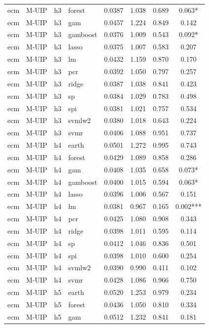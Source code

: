 \begin{ThreePartTable}
\begin{longtable}[t]{llclcccc}
ecm & M-UIP & h3 & forest & 0.0387 & 1.038 & 0.689 & 0.063*\\
ecm & M-UIP & h3 & gam & 0.0457 & 1.224 & 0.849 & 0.142\\
ecm & M-UIP & h3 & gamboost & 0.0376 & 1.009 & 0.543 & 0.092*\\
ecm & M-UIP & h3 & lasso & 0.0375 & 1.007 & 0.583 & 0.207\\
ecm & M-UIP & h3 & lm & 0.0432 & 1.159 & 0.870 & 0.170\\
ecm & M-UIP & h3 & pcr & 0.0392 & 1.050 & 0.797 & 0.257\\
ecm & M-UIP & h3 & ridge & 0.0387 & 1.038 & 0.841 & 0.423\\
ecm & M-UIP & h3 & sp & 0.0384 & 1.029 & 0.783 & 0.498\\
ecm & M-UIP & h3 & spi & 0.0381 & 1.021 & 0.757 & 0.534\\
ecm & M-UIP & h3 & svmlw2 & 0.0380 & 1.018 & 0.643 & 0.224\\
ecm & M-UIP & h3 & svmr & 0.0406 & 1.088 & 0.951 & 0.737\\
\addlinespace
ecm & M-UIP & h4 & earth & 0.0501 & 1.272 & 0.995 & 0.743\\
ecm & M-UIP & h4 & forest & 0.0429 & 1.089 & 0.858 & 0.286\\
ecm & M-UIP & h4 & gam & 0.0408 & 1.035 & 0.658 & 0.073*\\
ecm & M-UIP & h4 & gamboost & 0.0400 & 1.015 & 0.594 & 0.063*\\
ecm & M-UIP & h4 & lasso & 0.0396 & 1.006 & 0.567 & 0.151\\
ecm & M-UIP & h4 & lm & 0.0381 & 0.967 & 0.165 & 0.002***\\
ecm & M-UIP & h4 & pcr & 0.0425 & 1.080 & 0.908 & 0.343\\
ecm & M-UIP & h4 & ridge & 0.0398 & 1.011 & 0.595 & 0.114\\
ecm & M-UIP & h4 & sp & 0.0412 & 1.046 & 0.836 & 0.501\\
ecm & M-UIP & h4 & spi & 0.0398 & 1.010 & 0.600 & 0.254\\
ecm & M-UIP & h4 & svmlw2 & 0.0390 & 0.990 & 0.411 & 0.102\\
ecm & M-UIP & h4 & svmr & 0.0428 & 1.086 & 0.966 & 0.750\\
\addlinespace
ecm & M-UIP & h5 & earth & 0.0520 & 1.253 & 0.979 & 0.234\\
ecm & M-UIP & h5 & forest & 0.0436 & 1.050 & 0.810 & 0.334\\
ecm & M-UIP & h5 & gam & 0.0512 & 1.232 & 0.841 & 0.181\\

\end{longtable}
\end{ThreePartTable}
